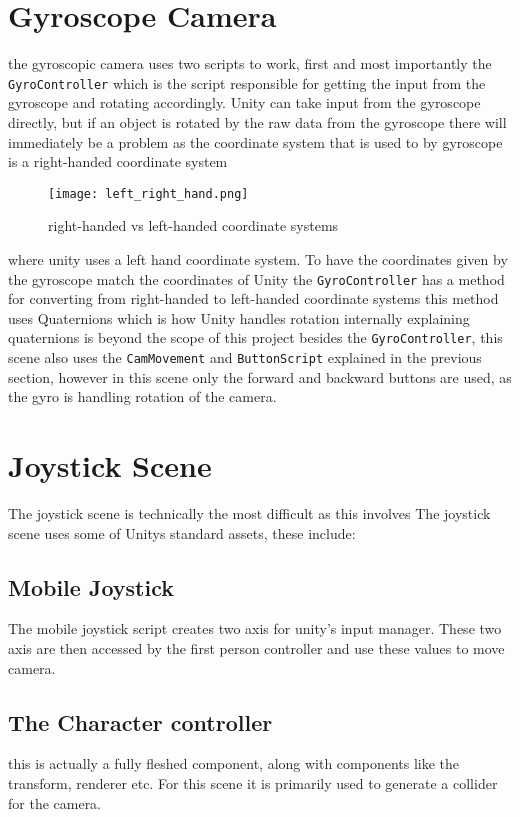 \section{Gyroscope Camera}
the gyroscopic camera uses two scripts to work, first and most importantly the {\tt GyroController} which is the script responsible for getting the input from the gyroscope and 
rotating accordingly. Unity can take input from the gyroscope directly, but if an object is rotated by the raw data from the gyroscope there will immediately be a problem as the coordinate system that is used to by gyroscope is a right-handed coordinate system 
\begin{figure}[H]
\centering
\texttt{[image: left\_right\_hand.png]}
\caption{right-handed vs left-handed coordinate systems}
\end{figure}
where unity uses a left hand coordinate system. To have the coordinates given by the gyroscope match the coordinates of Unity the {\tt GyroController} has a method for converting from right-handed to left-handed coordinate systems this method uses Quaternions which is how Unity handles rotation internally explaining quaternions is beyond the scope of this project\label{quaternions}
besides the {\tt GyroController}, this scene also uses the {\tt CamMovement} and {\tt ButtonScript} explained in the previous section, however in this scene only the forward and backward buttons are used, as the gyro is handling rotation of the camera.
\section{Joystick Scene} 
The joystick scene is technically the most difficult as this involves 
The joystick scene uses some of Unitys standard assets, these include:
\subsection*{Mobile Joystick}
The mobile joystick script creates two axis for unity's input manager. These two axis are then accessed by the first person controller and use these values to move camera. 


\subsection*{The Character controller}
this is actually a fully fleshed component, along with components like the transform, renderer etc. For this scene it is primarily used to generate a collider for the camera. 
